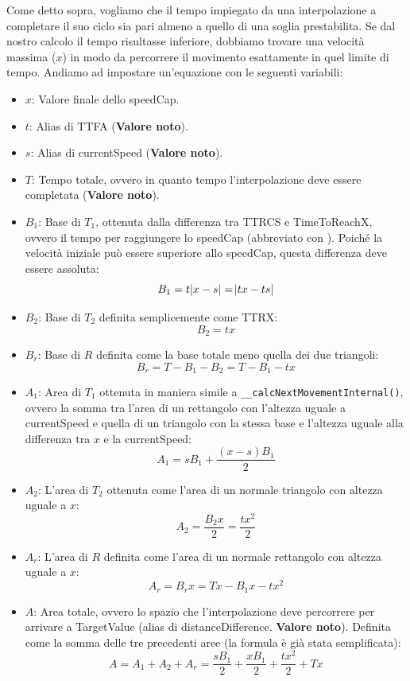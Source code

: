 \documentclass[main.tex]{subfiles}
\begin{document}
\noindent Come detto sopra, vogliamo che il tempo impiegato da una interpolazione a completare il suo ciclo sia pari almeno a quello di una soglia prestabilita. Se dal nostro calcolo il tempo risultasse inferiore, dobbiamo trovare una velocità massima ($x$) in modo da percorrere il movimento esattamente in quel limite di tempo. Andiamo ad impostare un'equazione con le seguenti variabili:
\begin{itemize}
    \item $x$: Valore finale dello speedCap.
    \item $t$: Alias di TTFA (\textbf{Valore noto}).
    \item $s$: Alias di currentSpeed (\textbf{Valore noto}).
    \item $T$: Tempo totale, ovvero in quanto tempo l'interpolazione deve essere completata (\textbf{Valore noto}).
    \item $B_1$: Base di $T_1$, ottenuta dalla differenza tra TTRCS e TimeToReachX, ovvero il tempo per raggiungere lo speedCap (abbreviato con ). Poiché la velocità iniziale può essere superiore allo speedCap, questa differenza deve essere assoluta: \[B_1 = t\abs{x - s} = \abs{tx - ts}\]
    \item $B_2$: Base di $T_2$ definita semplicemente come TTRX: \[B_2 = tx\]
    \item $B_r$: Base di $R$ definita come la base totale meno quella dei due triangoli: \[B_r = T - B_1 - B_2 = T - B_1 - tx\]
    \item $A_1$: Area di $T_1$ ottenuta in maniera simile a \lstinline{__calcNextMovementInternal()}, ovvero la somma tra l'area di un rettangolo con l'altezza uguale a currentSpeed e quella di un triangolo con la stessa base e l'altezza uguale alla differenza tra $x$ e la currentSpeed: \[A_1 = sB_1 + \frac{(x - s)B_1}{2}\]
    \item $A_2$: L'area di $T_2$ ottenuta come l'area di un normale triangolo con altezza uguale a $x$: \[A_2 = \frac{B_2x}{2} = \frac{tx^2}{2}\]
    \item $A_r$: L'area di $R$ definita come l'area di un normale rettangolo con altezza uguale a $x$: \[A_r = B_rx = Tx - B_1x - tx^2\]
    \item $A$: Area totale, ovvero lo spazio che l'interpolazione deve percorrere per arrivare a TargetValue (alias di distanceDifference. \textbf{Valore noto}). Definita come la somma delle tre precedenti aree (la formula è già stata semplificata): \[A = A_1 + A_2 + A_r = \frac{sB_1}{2} + \frac{xB_1}{2} + \frac{tx^2}{2} + Tx\]
\end{itemize}
\end{document}
